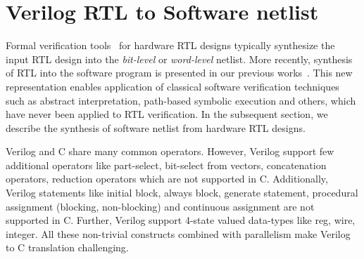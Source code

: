 \section{Verilog RTL to Software netlist}\label{sec:abstraction}
%
Formal verification tools~\cite{abc,DBLP:conf/fmcad/BradleyM07,vis} for 
hardware RTL designs typically synthesize the input RTL design into the
\emph{bit-level} or \emph{word-level} netlist.  
%
%
More recently, synthesis of RTL into the software program is presented 
in our previous works~\cite{mkm2015,mtk2016}.  This new representation 
enables application of classical software verification techniques such as 
abstract interpretation, path-based symbolic execution and others, which 
have never been applied to RTL verification.  In the subsequent section, 
we describe the synthesis of software netlist from hardware RTL designs.     

Verilog and C share many common operators.  However, Verilog support few 
additional operators like part-select, bit-select from vectors, concatenation
operators, reduction operators which are not supported in C.  Additionally, Verilog 
statements like initial block, always block, generate statement, procedural assignment 
(blocking, non-blocking) and continuous assignment are 
not supported in C. Further, Verilog support 4-state valued data-types 
like reg, wire, integer.  All these non-trivial constructs combined with 
parallelism make Verilog to C translation challenging.

